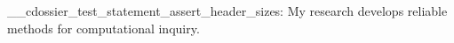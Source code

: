 \documentclass[type=research, fontsize=11pt, margin=narrow]{careerdossier-statement}
\begin{document}
\MakeCDossierStatementHeader
\ExplSyntaxOn
\__cdossier_test_statement_assert_header_sizes:
\ExplSyntaxOff
My research develops reliable methods for computational inquiry.
\end{document}
